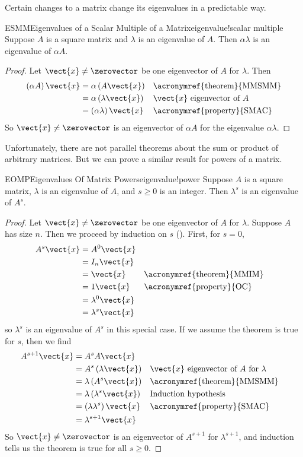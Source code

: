 %
Certain changes to a matrix change its eigenvalues in a predictable way.
%
\begin{theorem}{ESMM}{Eigenvalues of a Scalar Multiple of a Matrix}{eigenvalue!scalar multiple}
Suppose $A$ is a square matrix and $\lambda$ is an eigenvalue of $A$.  Then $\alpha\lambda$ is an eigenvalue of $\alpha A$.
\end{theorem}
%
\begin{proof}
%
Let $\vect{x}\neq\zerovector$ be one eigenvector of $A$ for $\lambda$.  Then
%
\begin{align*}
\left(\alpha A\right)\vect{x}&=\alpha\left(A\vect{x}\right)&&\text{\acronymref{theorem}{MMSMM}}\\
&=\alpha\left(\lambda\vect{x}\right)&&\text{$\vect{x}$ eigenvector of $A$}\\
&=\left(\alpha\lambda\right)\vect{x}&&\text{\acronymref{property}{SMAC}}
\end{align*}
%
So $\vect{x}\neq\zerovector$ is an eigenvector of $\alpha A$ for the eigenvalue $\alpha\lambda$.
\end{proof}
%
Unfortunately, there are not parallel theorems about the sum or product of arbitrary matrices.  But we can prove a similar result for powers of a matrix.
%
\begin{theorem}{EOMP}{Eigenvalues Of Matrix Powers}{eigenvalue!power}
Suppose $A$ is a square matrix, $\lambda$ is an eigenvalue of $A$, and $s\geq 0$ is an integer.  Then $\lambda^s$ is an eigenvalue of $A^s$.
\end{theorem}
%
\begin{proof}
%
Let $\vect{x}\neq\zerovector$ be one eigenvector of $A$ for $\lambda$.  Suppose $A$ has size $n$.  Then we proceed by induction on $s$ ().  First, for $s=0$,
%
\begin{align*}
A^s\vect{x}&=A^0\vect{x}\\
&=I_n\vect{x}\\
&=\vect{x}&&\text{\acronymref{theorem}{MMIM}}\\
&=1\vect{x}&&\text{\acronymref{property}{OC}}\\
&=\lambda^0\vect{x}\\
&=\lambda^s\vect{x}\\
\end{align*}
%
so $\lambda^s$ is an eigenvalue of $A^s$ in this special case.  If we assume the theorem is true for $s$, then we find
%
\begin{align*}
A^{s+1}\vect{x}&=A^sA\vect{x}\\
&=A^s\left(\lambda\vect{x}\right)&&\text{$\vect{x}$ eigenvector of $A$ for $\lambda$}\\
&=\lambda\left(A^s\vect{x}\right)&&\text{\acronymref{theorem}{MMSMM}}\\
&=\lambda\left(\lambda^s\vect{x}\right)&&\text{Induction hypothesis}\\
&=\left(\lambda\lambda^s\right)\vect{x}&&\text{\acronymref{property}{SMAC}}\\
&=\lambda^{s+1}\vect{x}
\end{align*}
%
So $\vect{x}\neq\zerovector$ is an eigenvector of $A^{s+1}$ for $\lambda^{s+1}$, and induction tells us the theorem is true for all $s\geq 0$.
%
\end{proof}
